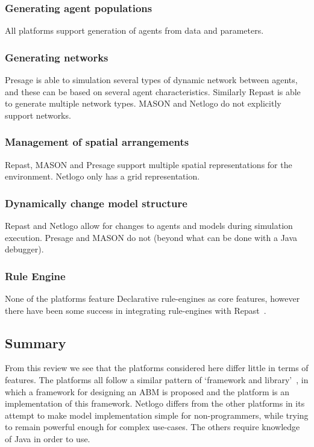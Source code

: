 \subsubsection*{Generating agent populations}

All platforms support generation of agents from data and parameters. 

\subsubsection*{Generating networks}

Presage is able to simulation several types of dynamic network between agents, and these can be based on several agent characteristics. Similarly Repast is able to generate multiple network types. MASON and Netlogo do not explicitly support networks.

\subsubsection*{Management of spatial arrangements}

Repast, MASON and Presage support multiple spatial representations for the environment. Netlogo only has a grid representation.

\subsubsection*{Dynamically change model structure}

Repast and Netlogo allow for changes to agents and models during simulation execution. Presage and MASON do not (beyond what can be done with a Java debugger).

\subsubsection*{Rule Engine}

None of the platforms feature Declarative rule-engines as core features, however there have been some success in integrating rule-engines with Repast~\citep{Lotzmann2011}. 

\subsection{Summary}

From this review we see that the platforms considered here differ little in terms of features. The platforms all follow a similar pattern of `framework and library'~\citep{Railsback2006}, in which a framework for designing an \ac{ABM} is proposed and the platform is an implementation of this framework. Netlogo differs from the other platforms in its attempt to make model implementation simple for non-programmers, while trying to remain powerful enough for complex use-cases. The others require knowledge of Java in order to use. 

